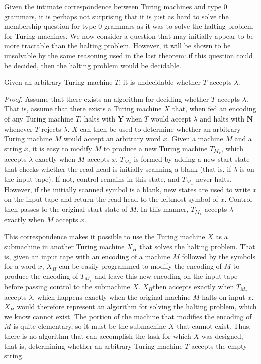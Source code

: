 Given the intimate correspondence between Turing machines and type 0 grammars,
it is perhaps not surprising that it is just as hard to solve the membership
question for type 0 grammars as it was to solve the halting problem for Turing
machines. We now consider a question that may initially appear to be more
tractable than the halting problem. However, it will be shown to be unsolvable
by the same reasoning used in the last theorem: if this question could be
decided, then the halting problem would be decidable.

\begin{thm}\label{thm-12.12}
Given an arbitrary Turing machine $T$, it is undecidable whether $T$ accepts
$\lambda$.

\emph{Proof.} Assume that there exists an algorithm for deciding whether $T$
accepts $\lambda$. That is, assume that there exists a Turing machine $X$ that,
when fed an encoding of any Turing machine $T$, halts with $\pmb{Y}$ when $T$
would accept $\lambda$ and halts with $\pmb{N}$ whenever $T$ rejects $\lambda$.
$X$ can then be used to determine whether an arbitrary Turing machine $M$ would
accept an arbitrary word $x$. Given a machine $M$ and a string $x$, it is easy
to modify $M$ to produce a new Turing machine $T_{M_x}$, which accepts $\lambda$
exactly when $M$ accepts $x$. $T_{M_x}$ is formed by adding a new start state
that checks whether the read head is initially scanning a blank (that is, if
$\lambda$ is on the input tape). If not, control remains in this state, and
$T_{M_x}$ never halts. However, if the initially scanned symbol is a blank, new
states are used to write $x$ on the input tape and return the read head to the
leftmost symbol of $x$. Control then passes to the original start state of $M$.
In this manner, $T_{M_x}$ accepts $\lambda$ exactly when $M$ accepts $x$.

This correspondence makes it possible to use the Turing machine $X$ as a
submachine in another Turing machine $X_H$ that solves the halting problem. That
is, given an input tape with an encoding of a machine $M$ followed by the
symbols for a word $x$, $X_H$ can be easily programmed to modify the encoding of
$M$ to produce the encoding of $T_{M_x}$ and leave this new encoding on the
input tape before passing control to the submachine $X$. $X_H $then accepts
exactly when $T_{M_x}$ accepts $\lambda$, which happens exactly when the original machine $M$ halts
on input $x$. $X_H$ would therefore represent an algorithm for solving the
halting problem, which we know cannot exist. The portion of the machine that
modifies the encoding of $M$ is quite elementary, so it must be the submachine
$X$ that cannot exist. Thus, there is no algorithm that can accomplish the task
for which $X$ was designed, that is, determining whether an arbitrary Turing
machine $T$ accepts the empty string.
\end{thm}

